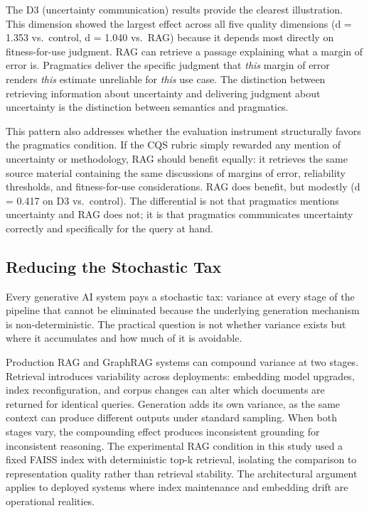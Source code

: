 \documentclass[
  11pt,
  letterpaper,
]{article}
\begin{document}
The D3 (uncertainty communication) results provide the clearest
illustration. This dimension showed the largest effect across all five
quality dimensions (d = 1.353 vs.~control, d = 1.040 vs.~RAG) because it
depends most directly on fitness-for-use judgment. RAG can retrieve a
passage explaining what a margin of error is. Pragmatics deliver the
specific judgment that \emph{this} margin of error renders \emph{this}
estimate unreliable for \emph{this} use case. The distinction between
retrieving information about uncertainty and delivering judgment about
uncertainty is the distinction between semantics and pragmatics.

This pattern also addresses whether the evaluation instrument
structurally favors the pragmatics condition. If the CQS rubric simply
rewarded any mention of uncertainty or methodology, RAG should benefit
equally: it retrieves the same source material containing the same
discussions of margins of error, reliability thresholds, and
fitness-for-use considerations. RAG does benefit, but modestly (d =
0.417 on D3 vs.~control). The differential is not that pragmatics
mentions uncertainty and RAG does not; it is that pragmatics
communicates uncertainty correctly and specifically for the query at
hand.

\subsection{Reducing the Stochastic
Tax}\label{reducing-the-stochastic-tax}

Every generative AI system pays a stochastic tax: variance at every
stage of the pipeline that cannot be eliminated because the underlying
generation mechanism is non-deterministic. The practical question is not
whether variance exists but where it accumulates and how much of it is
avoidable.

Production RAG and GraphRAG systems can compound variance at two stages.
Retrieval introduces variability across deployments: embedding model
upgrades, index reconfiguration, and corpus changes can alter which
documents are returned for identical queries. Generation adds its own
variance, as the same context can produce different outputs under
standard sampling. When both stages vary, the compounding effect
produces inconsistent grounding for inconsistent reasoning. The
experimental RAG condition in this study used a fixed FAISS index with
deterministic top-k retrieval, isolating the comparison to
representation quality rather than retrieval stability. The
architectural argument applies to deployed systems where index
maintenance and embedding drift are operational realities.
\end{document}
